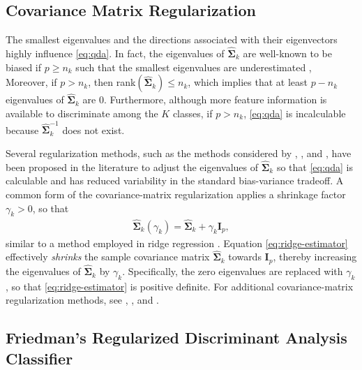\documentclass[11pt]{article}
\begin{document}
\subsection{Covariance Matrix Regularization}

The smallest eigenvalues and the directions associated with their eigenvectors highly influence \eqref{eq:qda}. In fact, the eigenvalues of $\widehat{\bm \Sigma}_k$ are well-known to be biased if $p \ge n_k$ such that the smallest eigenvalues are underestimated \citep{Seber:2004uh}, Moreover, if $p > n_k$, then rank$(\widehat{\bm \Sigma}_k) \le n_k$, which implies that at least $p - n_k$ eigenvalues of $\widehat{\bm \Sigma}_k$ are 0. Furthermore, although more feature information is available to discriminate among the $K$ classes, if $p > n_k$, \eqref{eq:qda} is incalculable because $\widehat{\bm \Sigma}_k^{-1}$ does not exist.

Several regularization methods, such as the methods considered by \citet*{Guo:2007te}, \cite{Mkhadri:1995jp}, and \citet*{Xu:2009fl}, have been proposed in the literature to adjust the eigenvalues of $\widehat{\bm \Sigma}_k$ so that \eqref{eq:qda} is calculable and has reduced variability in the standard bias-variance tradeoff.  A common form of the covariance-matrix regularization applies a shrinkage factor $\gamma_k > 0$, so that
\begin{align}
	\widehat{\bm \Sigma}_k(\gamma_k) =  \widehat{\bm \Sigma}_k + \gamma_k \bm I_p, \label{eq:ridge-estimator}
\end{align}
similar to a method employed in ridge regression \citep{Hoerl:1970cd}. Equation \eqref{eq:ridge-estimator} effectively \emph{shrinks} the sample covariance matrix $\widehat{\bm\Sigma}_k$ towards $\bm I_p$, thereby increasing the eigenvalues of $\widehat{\bm\Sigma}_k$ by $\gamma_k$. Specifically, the zero eigenvalues are replaced with $\gamma_k$, so that \eqref{eq:ridge-estimator} is positive definite. For additional covariance-matrix regularization methods, see \cite{Ramey:2011ji}, \cite{Xu:2009fl}, and \cite{Ye:2009gd}.

\subsection{Friedman's Regularized Discriminant Analysis Classifier}
\end{document}
